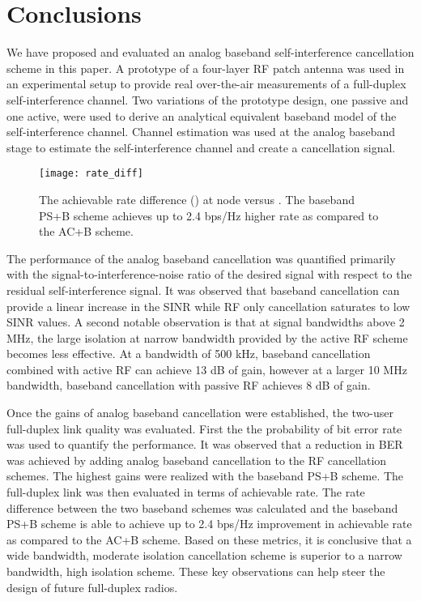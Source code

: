 \documentclass[12pt, journal,draftcls,letterpaper,onecolumn]{IEEEtran}
\begin{document}
\section{Conclusions}
\label{sec:conclusion}
We have proposed and evaluated an analog baseband self-interference cancellation scheme in this paper.  A prototype of a four-layer RF patch antenna was used in an experimental setup to provide real over-the-air measurements of a full-duplex self-interference channel.  Two variations of the prototype design, one passive and one active, were used to derive an analytical equivalent baseband model of the self-interference channel.  Channel estimation was used at the analog baseband stage to estimate the self-interference channel and create a cancellation signal.  
\begin{figure}[htp]
\begin{center} 
  \texttt{[image: rate\_diff]}
\caption[fig:rate]{The achievable rate difference () at node  versus .  The baseband PS+B scheme achieves up to 2.4 bps/Hz higher rate as compared to the AC+B scheme.} 
  \label{fig:rate} 
\end{center}  
\end{figure} 

The performance of the analog baseband cancellation was quantified primarily with the signal-to-interference-noise ratio of the desired signal with respect to the residual self-interference signal.  It was observed that baseband cancellation can provide a linear increase in the SINR while RF only cancellation saturates to low SINR values.  A second notable observation is that at signal bandwidths above 2 MHz, the large isolation at narrow bandwidth provided by the active RF scheme becomes less effective.  At a bandwidth of 500 kHz, baseband cancellation combined with active RF can achieve 13 dB of gain, however at a larger 10 MHz bandwidth, baseband cancellation with passive RF achieves 8 dB of gain.  

Once the gains of analog baseband cancellation were established, the two-user full-duplex link quality was evaluated. First the the probability of bit error rate was used to quantify the performance.  It was observed that a  reduction in BER was achieved by adding analog baseband cancellation to the RF cancellation schemes.  The highest gains were realized with the baseband PS+B scheme.  The full-duplex link was then evaluated in terms of achievable rate.  The rate difference between the two baseband schemes was calculated and the baseband PS+B scheme is able to achieve up to 2.4 bps/Hz improvement in achievable rate as compared to the AC+B scheme.  Based on these metrics, it is conclusive that a wide bandwidth, moderate isolation cancellation scheme is superior to a narrow bandwidth, high isolation scheme.  These key observations can help steer the design of future full-duplex radios.  
\end{document}
